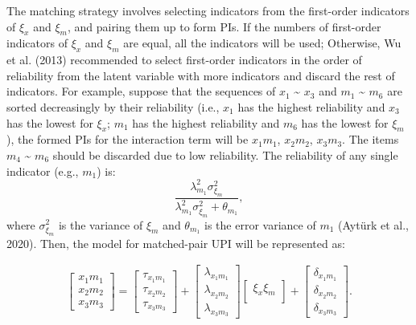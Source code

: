 \documentclass[
  man]{apa6}
\begin{document}
The matching strategy involves selecting indicators from the first-order indicators of \(\xi_{x}\) and \(\xi_{m}\), and pairing them up to form PIs. If the numbers of first-order indicators of \(\xi_{x}\) and \(\xi_{m}\) are equal, all the indicators will be used; Otherwise, Wu et al. (2013) recommended to select first-order indicators in the order of reliability from the latent variable with more indicators and discard the rest of indicators. For example, suppose that the sequences of \(x_{1}\) \textasciitilde{} \(x_{3}\) and \(m_{1}\) \textasciitilde{} \(m_{6}\) are sorted decreasingly by their reliability (i.e., \(x_{1}\) has the highest reliability and \(x_{3}\) has the lowest for \(\xi_{x}\); \(m_{1}\) has the highest reliability and \(m_{6}\) has the lowest for \(\xi_{m}\)), the formed PIs for the interaction term will be \(x_{1}m_{1}\), \(x_{2}m_{2}\), \(x_{3}m_{3}\). The items \(m_{4}\) \textasciitilde{} \(m_{6}\) should be discarded due to low reliability. The reliability of any single indicator (e.g., \(m_{1}\)) is:
\begin{equation}
\frac{\lambda_{m_{1}}^2\sigma_{\xi_{m}}^2}{\lambda_{m_{1}}^2\sigma_{\xi_{m}}^2 + \theta_{m_{1}}},
\end{equation}
where \(\sigma_{\xi_{m}}^2\) is the variance of \(\xi_{m}\) and \(\theta_{m_{1}}\) is the error variance of \(m_{1}\) (Aytürk et al., 2020). Then, the model for matched-pair UPI will be represented as:

\begin{align}
    \begin{bmatrix}
        x_{1}m_{1} \\
        x_{2}m_{2} \\
        x_{3}m_{3}
    \end{bmatrix} =
    \begin{bmatrix}
        \tau_{x_{1}m_{1}} \\
        \tau_{x_{2}m_{2}} \\ 
        \tau_{x_{3}m_{3}}
    \end{bmatrix} + 
    \begin{bmatrix}
        \lambda_{x_{1}m_{1}} \\
        \lambda_{x_{2}m_{2}} \\ 
        \lambda_{x_{3}m_{3}} 
    \end{bmatrix}
    \begin{bmatrix}
        \xi_{x}\xi_{m} \\
    \end{bmatrix} +
    \begin{bmatrix}
        \delta_{x_{1}m_{1}} \\
        \delta_{x_{2}m_{2}} \\ 
        \delta_{x_{3}m_{3}}
    \end{bmatrix}.
\end{align}
\end{document}
